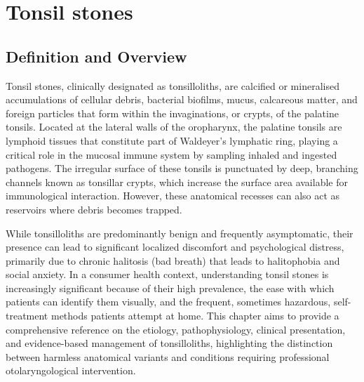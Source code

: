 \chapter{Tonsil stones}

\section*{Definition and Overview}
Tonsil stones, clinically designated as tonsilloliths, are calcified or mineralised accumulations of cellular debris, bacterial biofilms, mucus, calcareous matter, and foreign particles that form within the invaginations, or crypts, of the palatine tonsils. Located at the lateral walls of the oropharynx, the palatine tonsils are lymphoid tissues that constitute part of Waldeyer's lymphatic ring, playing a critical role in the mucosal immune system by sampling inhaled and ingested pathogens. The irregular surface of these tonsils is punctuated by deep, branching channels known as tonsillar crypts, which increase the surface area available for immunological interaction. However, these anatomical recesses can also act as reservoirs where debris becomes trapped.

While tonsilloliths are predominantly benign and frequently asymptomatic, their presence can lead to significant localized discomfort and psychological distress, primarily due to chronic halitosis (bad breath) that leads to halitophobia and social anxiety. In a consumer health context, understanding tonsil stones is increasingly significant because of their high prevalence, the ease with which patients can identify them visually, and the frequent, sometimes hazardous, self-treatment methods patients attempt at home. This chapter aims to provide a comprehensive reference on the etiology, pathophysiology, clinical presentation, and evidence-based management of tonsilloliths, highlighting the distinction between harmless anatomical variants and conditions requiring professional otolaryngological intervention.

